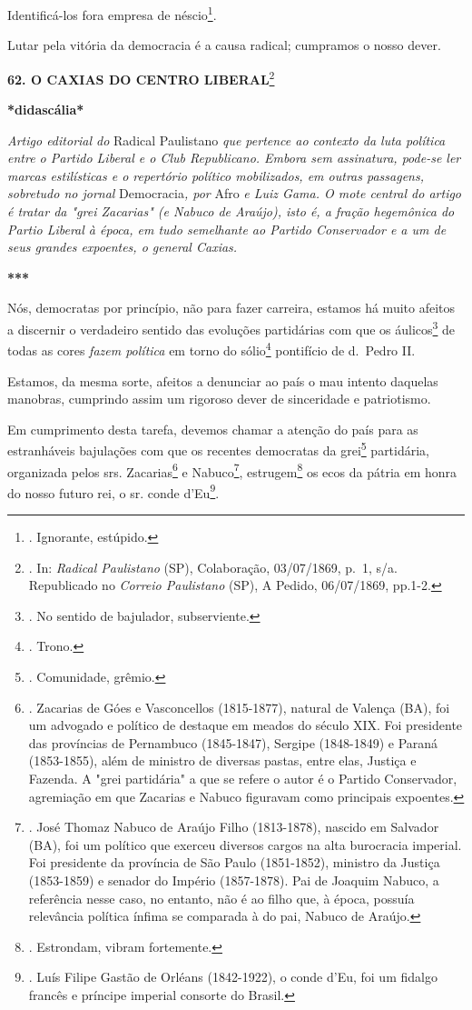 Identificá-los fora empresa de néscio\footnote{. Ignorante, estúpido.}.

Lutar pela vitória da democracia é a causa radical; cumpramos o nosso
dever.

\textbf{62. O CAXIAS DO CENTRO LIBERAL}\footnote{. In: \emph{Radical
  Paulistano} (SP), Colaboração, 03/07/1869, p.~1, s/a. Republicado no
  \emph{Correio Paulistano} (SP), A Pedido, 06/07/1869, pp.1-2.}

\textbf{*didascália*}

\emph{Artigo editorial do} Radical Paulistano \emph{que pertence ao
contexto da luta política entre o Partido Liberal e o Club Republicano.
Embora sem assinatura, pode-se ler marcas estilísticas e o repertório
político mobilizados, em outras passagens, sobretudo no jornal}
Democracia\emph{, por} Afro \emph{e Luiz Gama. O mote central do artigo
é tratar da "grei Zacarias" (e Nabuco de Araújo), isto é, a fração
hegemônica do Partio Liberal à época, em tudo semelhante ao Partido
Conservador e a um de seus grandes expoentes, o general Caxias.}

\textbf{***}

Nós, democratas por princípio, não para fazer carreira, estamos há muito
afeitos a discernir o verdadeiro sentido das evoluções partidárias com
que os áulicos\footnote{. No sentido de bajulador, subserviente.} de
todas as cores \emph{fazem política} em torno do sólio\footnote{. Trono.}
pontifício de d.~Pedro II.

Estamos, da mesma sorte, afeitos a denunciar ao país o mau intento
daquelas manobras, cumprindo assim um rigoroso dever de sinceridade e
patriotismo.

Em cumprimento desta tarefa, devemos chamar a atenção do país para as
estranháveis bajulações com que os recentes democratas da
grei\footnote{. Comunidade, grêmio.} partidária, organizada pelos srs.
Zacarias\footnote{. Zacarias de Góes e Vasconcellos (1815-1877), natural
  de Valença (BA), foi um advogado e político de destaque em meados do
  século XIX. Foi presidente das províncias de Pernambuco (1845-1847),
  Sergipe (1848-1849) e Paraná (1853-1855), além de ministro de diversas
  pastas, entre elas, Justiça e Fazenda. A "grei partidária" a que se
  refere o autor é o Partido Conservador, agremiação em que Zacarias e
  Nabuco figuravam como principais expoentes.} e Nabuco\footnote{. José
  Thomaz Nabuco de Araújo Filho (1813-1878), nascido em Salvador (BA),
  foi um político que exerceu diversos cargos na alta burocracia
  imperial. Foi presidente da província de São Paulo (1851-1852),
  ministro da Justiça (1853-1859) e senador do Império (1857-1878). Pai
  de Joaquim Nabuco, a referência nesse caso, no entanto, não é ao filho
  que, à época, possuía relevância política ínfima se comparada à do
  pai, Nabuco de Araújo.}, estrugem\footnote{. Estrondam, vibram
  fortemente.} os ecos da pátria em honra do nosso futuro rei, o sr.
conde d'Eu\footnote{. Luís Filipe Gastão de Orléans (1842-1922), o conde
  d'Eu, foi um fidalgo francês e príncipe imperial consorte do Brasil.}.

